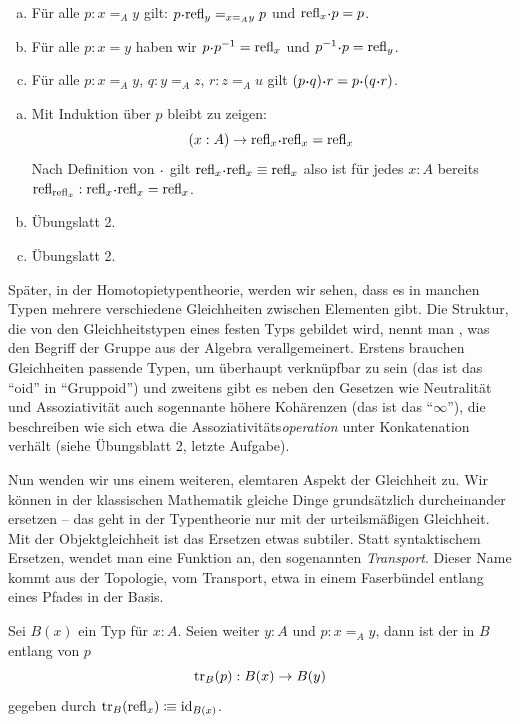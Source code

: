 \begin{lemma}
\label{gliecheits-gruppoid}
\begin{enumerate}[(a)]
\item Für alle $ p:x=_Ay$ gilt: $ p\kon\refl_y=_{x=_Ay} p$ und $\refl_x\kon p=p$.
\item Für alle $ p:x=y$ haben wir $ p\kon p^{-1}=\refl_x$ und $p^{-1}\kon p=\refl_y$.
\item Für alle $ p:x=_Ay$, $ q:y=_Az$, $ r:z=_Au$ gilt
   $( p\kon q)\kon r= p\kon( q\kon r)$.
\end{enumerate}
\end{lemma}
\begin{beweis}
\begin{enumerate}[(a)]
\item Mit Induktion über $p$ bleibt zu zeigen:
 \[
    (x:A) \to \refl_x\kon\refl_x=\refl_x
 \]
 Nach Definition von $\kon$ gilt $\refl_x\kon\refl_x\equiv\refl_x$ also ist für jedes $x:A$ bereits $\refl_{\refl_x}:\refl_x\kon\refl_x=\refl_x$.
 \item Übungslatt 2.
 \item Übungslatt 2.
\end{enumerate}
\end{beweis}

Später, in der Homotopietypentheorie, werden wir sehen, dass es in manchen Typen mehrere verschiedene Gleichheiten zwischen Elementen gibt.
Die Struktur, die von den Gleichheitstypen eines festen Typs gebildet wird, nennt man , was den Begriff der Gruppe aus der Algebra verallgemeinert. Erstens brauchen Gleichheiten passende Typen, um überhaupt verknüpfbar zu sein (das ist das ``oid'' in ``Gruppoid'') und zweitens gibt es neben den Gesetzen wie Neutralität und Assoziativität auch sogennante höhere Kohärenzen (das ist das ``$\infty$''), die beschreiben wie sich etwa die Assoziativitäts\emph{operation} unter Konkatenation verhält (siehe Übungsblatt 2, letzte Aufgabe).

Nun wenden wir uns einem weiteren, elemtaren Aspekt der Gleichheit zu.
Wir können in der klassischen Mathematik gleiche Dinge grundsätzlich durcheinander ersetzen -- das geht in der Typentheorie nur mit der urteilsmäßigen Gleichheit.
Mit der Objektgleichheit ist das Ersetzen etwas subtiler.
Statt syntaktischem Ersetzen, wendet man eine Funktion an, den sogenannten \emph{Transport}.
Dieser Name kommt aus der Topologie, vom Transport, etwa in einem Faserbündel entlang eines Pfades in der Basis.

\begin{definition}
  Sei $B(x)$ ein Typ für $x:A$.
  Seien weiter $y:A$ und $p:x=_Ay$, dann ist der  in $B$ entlang von $p$
  \[
    \mathrm{tr}_B(p): B(x)\to B(y)
  \]
  gegeben durch $\mathrm{tr}_B(\mathrm{refl}_x)\vcentcolon\mspace{-1.2mu}\equiv \mathrm{id}_{B(x)}$.  
\end{definition}

